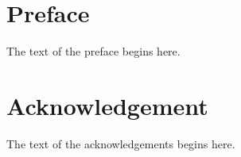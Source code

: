 \documentclass{report}
\begin{document}
\newpage 
~ 

\newpage 
~

\chapter*{Preface}
The text of the preface begins here. 
%

\chapter*{Acknowledgement}
The text of the acknowledgements begins here.

\tableofcontents
\end{document}
